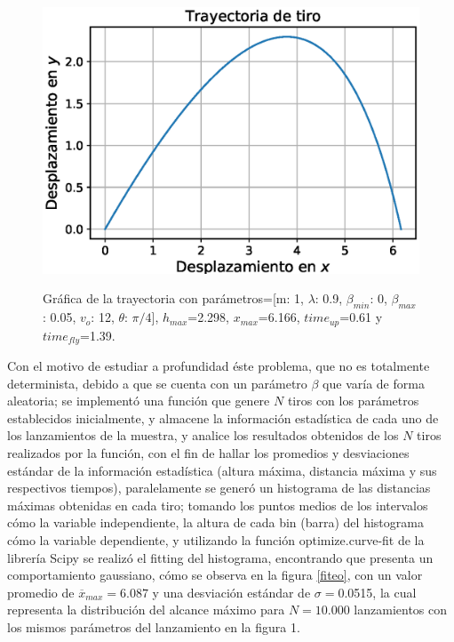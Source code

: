 \documentclass[11pt,letterpaper,twocolumn]{article}
\begin{document}
\begin{figure}[h!]
\centering
\includegraphics[scale=0.6]{tra.eps}
\label{tra}
\caption{Gráfica de la trayectoria con parámetros=[m: 1, $\lambda$: 0.9, $\beta_{min}$: 0, $\beta_{max}$: 0.05, $v_{o}$: 12, $\theta$: $\pi /4$], $h_{max}$=2.298, $x_{max}$=6.166, $time_{up}$=0.61 y $time_{fly}$=1.39.}
\end{figure}
\newpage
\par 
Con el motivo de estudiar a profundidad éste problema, que no es totalmente determinista, debido a que se cuenta con un parámetro $\beta$ que varía de forma aleatoria; se implementó una función que genere $N$ tiros con los parámetros establecidos inicialmente, y almacene la información estadística de cada uno de los lanzamientos de la muestra, y analice los resultados obtenidos de los $N$ tiros realizados por la función, con el fin de hallar los promedios y desviaciones estándar de la información estadística (altura máxima, distancia máxima y sus respectivos tiempos), paralelamente se generó un histograma de las distancias máximas obtenidas en cada tiro; tomando los puntos medios de los intervalos cómo la variable independiente, la altura de cada bin (barra) del histograma cómo la variable dependiente, y utilizando la función optimize.curve-fit de la librería Scipy se realizó el fitting del histograma, encontrando que presenta un comportamiento gaussiano, cómo se observa en la figura \ref{fiteo}, con un valor promedio de $\overline{x}_{max}=6.087$ y una desviación estándar de $\sigma=$0.0515, la cual representa la distribución del alcance máximo para $N=10.000$ lanzamientos con los mismos parámetros del lanzamiento en la figura 1. 
\end{document}
